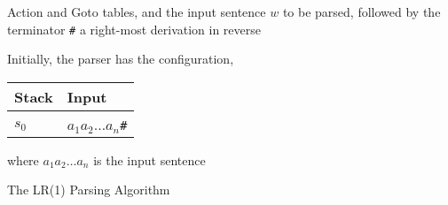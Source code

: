 \documentclass[8pt,a4paper,compress]{beamer}
\begin{document}
\begin{frame}[fragile]
\pause

\begin{algorithm}[H]
\begin{algorithmic}
\REQUIRE Action and Goto tables, and the input sentence $w$ to be parsed, followed by the terminator \lstinline{#}
\ENSURE a right-most derivation in reverse

\STATE Initially, the parser has the configuration,

\begin{table}[H]
\begin{tabular}{ll}
Stack & Input \\ \hline \\
$s_0$ & $a_1 a_2 \dots a_n$\lstinline$#$
\end{tabular}
\end{table}

\bigskip

\noindent where $a_1 a_2 \dots a_n$ is the input sentence
\end{algorithmic}
\caption{The LR(1) Parsing Algorithm}
\end{algorithm}
\end{frame}
\end{document}
